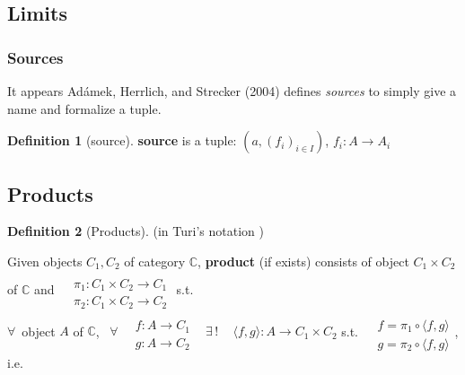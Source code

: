 \documentclass[twoside,landscape,10pt]{amsart}
\theoremstyle{plain}
\theoremstyle{definition}
\newtheorem{definition}{Definition}
\theoremstyle{remark}
\begin{document}
\begin{multicols*}{2}
\section{Limits}


\subsubsection{Sources}

It appears Ad\'{a}mek, Herrlich, and Strecker (2004) \cite{AHS2004} defines \emph{sources} to simply give a name and formalize a tuple.  

\begin{definition}[source]
  \textbf{source} is a tuple: $(a, (f_i)_{i\in I})$, $f_i:A\to A_i$
\end{definition}



\subsection{Products}

\begin{definition}[Products]

(in Turi's notation \cite{Turi2001})

Given objects $C_1,C_2$ of category $\mathbb{C}$, \textbf{product} (if exists) consists of object $C_1 \times C_2$ of $\mathbb{C}$ and $\begin{aligned} & \quad \\
  & \pi_1 : C_1 \times C_2 \to C_1 \\
  & \pi_2: C_1 \times C_2 \to C_2 \end{aligned}$ s.t. \\
$\forall \, $ object $A$ of $\mathbb{C}$, \, $\forall \, \begin{aligned} & \quad \\
  & f : A \to C_1 \\
  & g : A \to C_2 \end{aligned}$ \quad \, $\exists \, ! \quad \, \langle f,g \rangle : A \to C_1 \times C_2$ s.t. $\begin{aligned} & \quad \\
  & f = \pi_1 \circ \langle f,g \rangle \\
  & g = \pi_2 \circ \langle f,g \rangle \end{aligned}$, i.e. 



\end{definition}
\end{multicols*}
\end{document}
